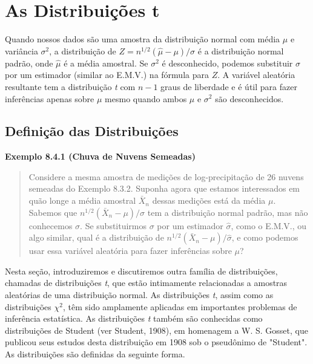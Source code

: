 \section{As Distribuições t}

Quando nossos dados são uma amostra da distribuição normal com média $\mu$ e variância $\sigma^2$, a distribuição de $Z = n^{1/2}(\hat{\mu} - \mu)/\sigma$ é a distribuição normal padrão, onde $\hat{\mu}$ é a média amostral. Se $\sigma^2$ é desconhecido, podemos substituir $\sigma$ por um estimador (similar ao E.M.V.) na fórmula para $Z$. A variável aleatória resultante tem a distribuição \textit{t} com $n-1$ graus de liberdade e é útil para fazer inferências apenas sobre $\mu$ mesmo quando ambos $\mu$ e $\sigma^2$ são desconhecidos.

\subsection*{Definição das Distribuições}

\vspace{1em}
\noindent\textbf{Exemplo 8.4.1 (Chuva de Nuvens Semeadas)}
\begin{quote}
    Considere a mesma amostra de medições de log-precipitação de 26 nuvens semeadas do Exemplo 8.3.2. Suponha agora que estamos interessados em quão longe a média amostral $\bar{X}_n$ dessas medições está da média $\mu$. Sabemos que $n^{1/2}(\bar{X}_n - \mu)/\sigma$ tem a distribuição normal padrão, mas não conhecemos $\sigma$. Se substituirmos $\sigma$ por um estimador $\hat{\sigma}$, como o E.M.V., ou algo similar, qual é a distribuição de $n^{1/2}(\bar{X}_n - \mu)/\hat{\sigma}$, e como podemos usar essa variável aleatória para fazer inferências sobre $\mu$?
\end{quote}
\vspace{1em}

Nesta seção, introduziremos e discutiremos outra família de distribuições, chamadas de distribuições \textit{t}, que estão intimamente relacionadas a amostras aleatórias de uma distribuição normal. As distribuições \textit{t}, assim como as distribuições $\chi^2$, têm sido amplamente aplicadas em importantes problemas de inferência estatística. As distribuições \textit{t} também são conhecidas como distribuições de Student (ver Student, 1908), em homenagem a W. S. Gosset, que publicou seus estudos desta distribuição em 1908 sob o pseudônimo de "Student". As distribuições são definidas da seguinte forma.

